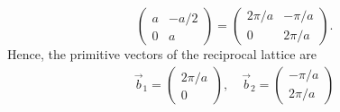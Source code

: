 \begin{questions}
\begin{solution}
\begin{equation}
\begin{pmatrix}
      a & -a/2\\
      0 & a
    \end{pmatrix} = \begin{pmatrix}
      2\pi/a & -\pi/a\\
      0 & 2\pi/a
    \end{pmatrix}.
  \end{equation}
  Hence, the primitive vectors of the reciprocal lattice are
  \begin{eqnarray}
    \vec{b}_1 =\begin{pmatrix}
      2\pi/a\\
      0
    \end{pmatrix}, \quad \vec{b}_2 = \begin{pmatrix}
       -\pi/a\\
       2\pi/a
    \end{pmatrix}
  \end{eqnarray}
\end{solution}

\end{questions}

%
%
